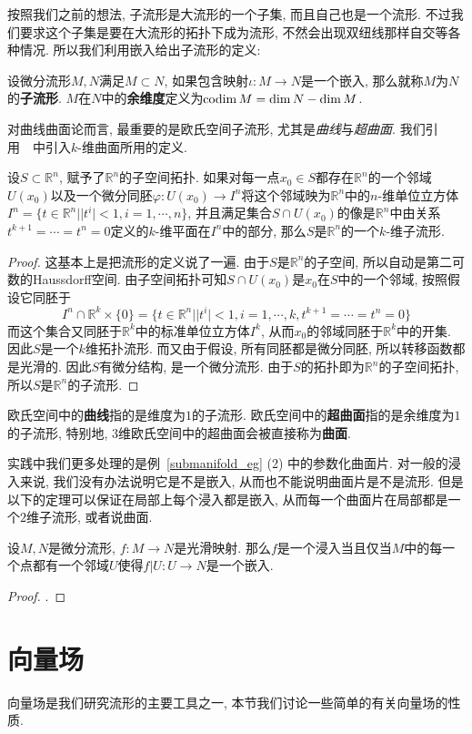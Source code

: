 按照我们之前的想法, 子流形是大流形的一个子集, 而且自己也是一个流形.
不过我们要求这个子集是要在大流形的拓扑下成为流形, 不然会出现双纽线那样自交等各种情况.
所以我们利用嵌入给出子流形的定义:
\begin{defn}
    设微分流形$M,N$满足$M\subset N$, 如果包含映射$\iota:M\to N$是一个嵌入, 那么就称$M$为$N$的\textbf{子流形}.
    $M$在$N$中的\textbf{余维度}定义为$\operatorname*{codim}{M}=\dim{N}-\dim{M}$.
\end{defn}

对曲线曲面论而言, 最重要的是欧氏空间子流形, 尤其是\textit{曲线}与\textit{超曲面}.
我们引用~\parencite[8.7节定义1]{Zorich_MathAnal}~中引入$k$-维曲面所用的定义.
\begin{thm}
    设$S\subset\mathbb{R}^n$, 赋予了$\mathbb{R}^n$的子空间拓扑.
    如果对每一点$x_0\in S$都存在$\mathbb{R}^n$的一个邻域$U(x_0)$以及一个微分同胚$\varphi:U(x_0)\to I^n$将这个邻域映为$\mathbb{R}^n$中的$n$-维单位立方体$I^n=\{t\in\mathbb{R}^n||t^i|<1,i=1,\cdots,n\}$,
    并且满足集合$S\cap U(x_0)$的像是$\mathbb{R}^n$中由关系$t^{k+1}=\cdots=t^n=0$定义的$k$-维平面在$I^n$中的部分,
    那么$S$是$\mathbb{R}^n$的一个$k$-维子流形.
\end{thm}
\begin{proof}
    这基本上是把流形的定义说了一遍.
    由于$S$是$\mathbb{R}^n$的子空间, 所以自动是第二可数的Haussdorff空间.
    由子空间拓扑可知$S\cap U(x_0)$是$x_0$在$S$中的一个邻域, 按照假设它同胚于
    \[I^n\cap\mathbb{R}^k\times\{0\}=\{t\in\mathbb{R}^n||t^i|<1,i=1,\cdots,k,t^{k+1}=\cdots=t^n=0\}\]
    而这个集合又同胚于$\mathbb{R}^k$中的标准单位立方体$I^k$, 从而$x_0$的邻域同胚于$\mathbb{R}^k$中的开集.
    因此$S$是一个$k$维拓扑流形.
    而又由于假设, 所有同胚都是微分同胚, 所以转移函数都是光滑的.
    因此$S$有微分结构, 是一个微分流形.
    由于$S$的拓扑即为$\mathbb{R}^n$的子空间拓扑, 所以$S$是$\mathbb{R}^n$的子流形.
\end{proof}

\begin{defn}
    欧氏空间中的\textbf{曲线}指的是维度为$1$的子流形.
    欧氏空间中的\textbf{超曲面}指的是余维度为$1$的子流形, 特别地, $3$维欧氏空间中的超曲面会被直接称为\textbf{曲面}.
\end{defn}

实践中我们更多处理的是例~\ref{submanifold_eg} (2) 中的参数化曲面片.
对一般的浸入来说, 我们没有办法说明它是不是嵌入, 从而也不能说明曲面片是不是流形.
但是以下的定理可以保证在局部上每个浸入都是嵌入, 从而每一个曲面片在局部都是一个$2$维子流形, 或者说曲面.
\begin{thm}
    设$M,N$是微分流形, $f:M\to N$是光滑映射.
    那么$f$是一个浸入当且仅当$M$中的每一个点都有一个邻域$U$使得$f|U:U\to N$是一个嵌入.
\end{thm}
\begin{proof}
    \parencite[定理4.25]{Lee_IntroSmMani}.
\end{proof}

\section{向量场}
向量场是我们研究流形的主要工具之一, 本节我们讨论一些简单的有关向量场的性质.